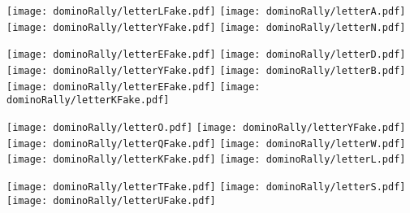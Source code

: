\begin{puzzle}
\begin{center}
  \texttt{[image: dominoRally/letterLFake.pdf]}\hspace{0.03\linewidth}
  \texttt{[image: dominoRally/letterA.pdf]}\hspace{0.03\linewidth}
  \texttt{[image: dominoRally/letterYFake.pdf]}\hspace{0.03\linewidth}
  \texttt{[image: dominoRally/letterN.pdf]}\hspace{0.03\linewidth}
\end{center}
\begin{center}
  \texttt{[image: dominoRally/letterEFake.pdf]}\hspace{0.03\linewidth}
  \texttt{[image: dominoRally/letterD.pdf]}\hspace{0.03\linewidth}
  \texttt{[image: dominoRally/letterYFake.pdf]}\hspace{0.03\linewidth}
  \texttt{[image: dominoRally/letterB.pdf]}\hspace{0.03\linewidth}
  \texttt{[image: dominoRally/letterEFake.pdf]}\hspace{0.03\linewidth}
  \texttt{[image: dominoRally/letterKFake.pdf]}\hspace{0.03\linewidth}
\end{center}
\begin{center}
  \texttt{[image: dominoRally/letterO.pdf]}\hspace{0.03\linewidth}
  \texttt{[image: dominoRally/letterYFake.pdf]}\hspace{0.03\linewidth}
  \texttt{[image: dominoRally/letterQFake.pdf]}\hspace{0.03\linewidth}
  \texttt{[image: dominoRally/letterW.pdf]}\hspace{0.03\linewidth}
  \texttt{[image: dominoRally/letterKFake.pdf]}\hspace{0.03\linewidth}
  \texttt{[image: dominoRally/letterL.pdf]}\hspace{0.03\linewidth}
\end{center}
\begin{center}
  \texttt{[image: dominoRally/letterTFake.pdf]}\hspace{0.03\linewidth}
  \texttt{[image: dominoRally/letterS.pdf]}\hspace{0.03\linewidth}
  \texttt{[image: dominoRally/letterUFake.pdf]}\hspace{0.03\linewidth}
\end{center}

\end{puzzle}

